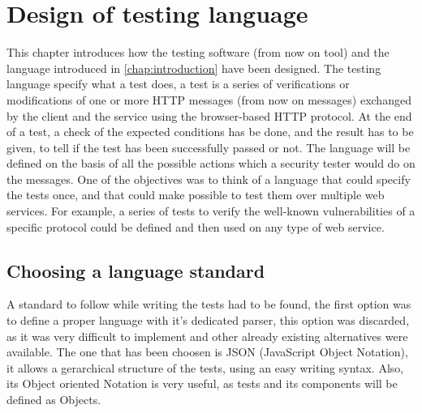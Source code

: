 \chapter{Design of testing language}
\label{chap:Design}
This chapter introduces how the testing software (from now on tool) and the language introduced in \ref{chap:introduction} have been designed. The testing language specify what a test does, a test is a series of verifications or modifications of one or more HTTP messages (from now on messages) exchanged by the client and the service using the browser-based HTTP protocol. At the end of a test, a check of the expected conditions has be done, and the result has to be given, to tell if the test has been successfully passed or not. The language will be defined on the basis of all the possible actions which a security tester would do on the messages. 
One of the objectives was to think of a language that could specify the tests once, and that could make possible to test them over multiple web services. For example, a series of tests to verify the well-known vulnerabilities of a specific protocol could be defined and then used on any type of web service.

\section{Choosing a language standard}
A standard to follow while writing the tests had to be found, the first option was to define a proper language with it's dedicated parser, this option was discarded, as it was very difficult to implement and other already existing alternatives were available. The one that has been choosen is JSON (JavaScript Object Notation), it allows a gerarchical structure of the tests, using an easy writing syntax. Also, its Object oriented Notation is very useful, as tests and its components will be defined as Objects.

